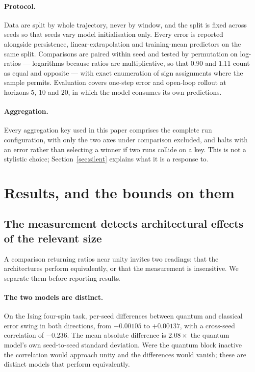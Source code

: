 \documentclass[11pt,onecolumn]{article}
\begin{document}
\paragraph{Protocol.}
Data are split by whole trajectory, never by window, and the split is
fixed across seeds so that seeds vary model initialisation only. Every
error is reported alongside persistence, linear-extrapolation and
training-mean predictors on the same split. Comparisons are paired
within seed and tested by permutation on log-ratios --- logarithms
because ratios are multiplicative, so that $0.90$ and $1.11$ count as
equal and opposite --- with exact enumeration of sign assignments where
the sample permits. Evaluation covers one-step error and open-loop
rollout at horizons $5$, $10$ and $20$, in which the model consumes its
own predictions.

\paragraph{Aggregation.}
Every aggregation key used in this paper comprises the complete run
configuration, with only the two axes under comparison excluded, and
halts with an error rather than selecting a winner if two runs collide
on a key. This is not a stylistic choice; Section~\ref{sec:silent}
explains what it is a response to.

\section{Results, and the bounds on them}\label{sec:results}
\subsection{The measurement detects architectural effects of the
            relevant size}\label{sec:sensitivity}
A comparison returning ratios near unity invites two readings: that the
architectures perform equivalently, or that the measurement is
insensitive. We separate them before reporting results.

\paragraph{The two models are distinct.}
On the Ising four-spin task, per-seed differences between quantum and
classical error swing in both directions, from $-0.00105$ to
$+0.00137$, with a cross-seed correlation of $-0.236$. The mean absolute
difference is $2.08\times$ the quantum model's own seed-to-seed standard
deviation. Were the quantum block inactive the correlation would
approach unity and the differences would vanish; these are distinct
models that perform equivalently.
\end{document}
